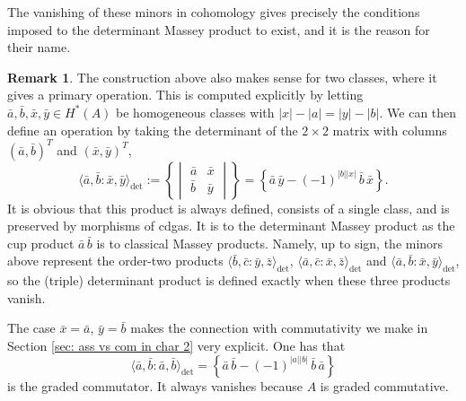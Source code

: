 \documentclass[11pt]{article}
\theoremstyle{definition}
\theoremstyle{definition}
\newtheorem{remark}[theorem]{Remark}
\begin{document}
The vanishing of these minors in cohomology
gives precisely the conditions imposed to the determinant Massey product to exist,
and it is the reason for their name.


\begin{remark}
\label{rmk: order two}
The construction above also makes sense for two classes, where it gives a primary operation.
This is computed explicitly by letting $\bar a,\bar b,\bar x,\bar y\in H^*(A)$ be homogeneous classes with $|x|-|a|=|y|-|b|$.
We can then define an operation by taking the determinant of the $2\times 2$ matrix
with columns $(\bar a,\bar b)^T$ and $(\bar x,\bar y)^T$,
\begin{equation*}
\langle \bar a,\bar b : \bar x,\bar y\rangle_{\det}
:=\left\{\begin{vmatrix} \bar a & \bar x\\ \bar b & \bar y\end{vmatrix}\right\}
=\left\{\bar a\,\bar y-(-1)^{|b||x|}\,\bar b\,\bar x\right\}.
\end{equation*}
It is obvious that this product is always defined, consists of a single class,
and is preserved by morphisms of cdgas.
It is to the determinant Massey product as the cup product $\bar a\,\bar b$ is to classical Massey products.
Namely, up to sign, the minors above represent the order-two products
$\langle \bar b,\bar c : \bar y,\bar z\rangle_{\det}$, $\langle \bar a,\bar c : \bar x,\bar z\rangle_{\det}$ and
$\langle \bar a,\bar b : \bar x,\bar y\rangle_{\det}$, so the (triple) determinant product is defined exactly when these three products vanish.

The case $\bar x=\bar a$, $\bar y=\bar b$ makes the connection with commutativity we make in Section \ref{sec: ass vs com in char 2} very explicit. 
One has that
\begin{equation*}
\langle \bar a,\bar b : \bar a,\bar b\rangle_{\det}=\left\{\bar a\,\bar b-(-1)^{|a||b|}\,\bar b\,\bar a\right\}
\end{equation*}
is the graded commutator. 
It always vanishes because $A$ is graded commutative.
\end{remark}
\end{document}
